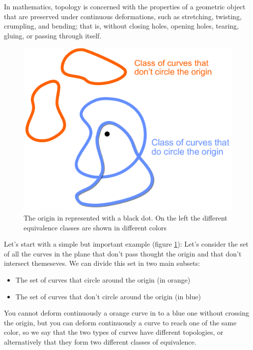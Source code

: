 \label{sec:no_flat}
In mathematics, topology is concerned with the properties of a geometric object that are preserved under continuous deformations, such as stretching, twisting, crumpling, and bending; that is, without closing holes, opening holes, tearing, gluing, or passing through itself.\\
\begin{figure}
    \includegraphics[width=.6\textwidth]{Immagini/topo/topo1.pdf}
    \caption{The origin in represented with a black dot. On the left the different equivalence classes are shown in different colors}
    \label{fig:topo1}
\end{figure} 
Let's start with a simple but important example (figure \ref{fig:topo1}):
Let's consider the set of all the curves in the plane that don't pass thought the origin and that don't intersect themeseves. We can divide this set in two main subsets:
\begin{itemize}
    \item The set of curves that circle around the origin (in orange)
    \item The set of curves that don't circle around the origin (in blue)
\end{itemize}
You cannot deform continuously a orange curve in to a blue one without crossing the origin, but you can deform continuously a curve to reach one of the same color, so we say that the two types of curves have different topologies, or alternatively that they form two different classes of equivalence.

